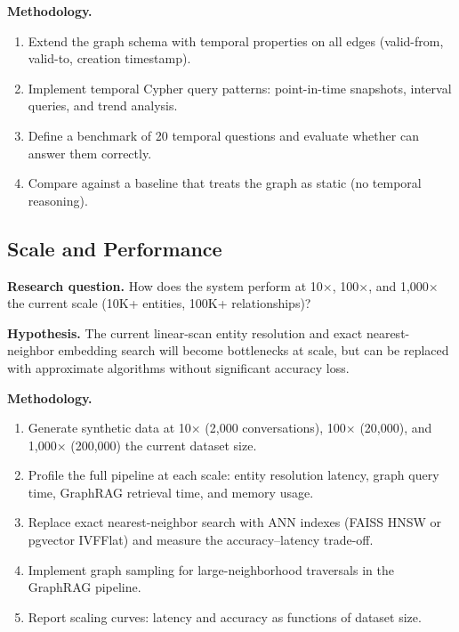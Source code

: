 \medskip\noindent\textbf{Methodology.}

\begin{enumerate}
    \item Extend the graph schema with temporal properties on all edges
          (valid-from, valid-to, creation timestamp).
    \item Implement temporal Cypher query patterns: point-in-time
          snapshots, interval queries, and trend analysis.
    \item Define a benchmark of 20 temporal questions and evaluate whether
          \sysname{} can answer them correctly.
    \item Compare against a baseline that treats the graph as static (no
          temporal reasoning).
\end{enumerate}


\subsection{Scale and Performance}
\label{sec:future-scale}

\noindent\textbf{Research question.}
How does the system perform at 10$\times$, 100$\times$, and 1{,}000$\times$
the current scale (10K+ entities, 100K+ relationships)?

\medskip\noindent\textbf{Hypothesis.}
The current linear-scan entity resolution and exact nearest-neighbor
embedding search will become bottlenecks at scale, but can be replaced
with approximate algorithms without significant accuracy loss.

\medskip\noindent\textbf{Methodology.}

\begin{enumerate}
    \item Generate synthetic data at 10$\times$ (2,000 conversations),
          100$\times$ (20,000), and 1{,}000$\times$ (200,000) the current
          dataset size.
    \item Profile the full pipeline at each scale: entity resolution
          latency, graph query time, GraphRAG retrieval time, and memory
          usage.
    \item Replace exact nearest-neighbor search with ANN indexes
          (FAISS HNSW or pgvector IVFFlat) and measure the
          accuracy--latency trade-off.
    \item Implement graph sampling for large-neighborhood traversals in
          the GraphRAG pipeline.
    \item Report scaling curves: latency and accuracy as functions of
          dataset size.
\end{enumerate}
